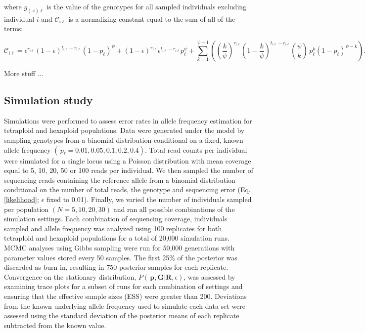 \documentclass[11pt,english,letterpaper,oneside]{article}
\begin{document}
\noindent where $g_{(\text{-}i) \ell}$ is the value of the genotypes for all sampled individuals excluding individual $i$ and $\mathcal{C}_{i \ell}$ is a normalizing constant equal to the sum of all of the terms:

\begin{equation*}
\mathcal{C}_{i \ell} = \epsilon^{r_{i \ell}}(1-\epsilon)^{t_{i \ell}-r_{i \ell}}(1-p_{\ell})^\psi + (1-\epsilon)^{r_{i \ell}}\epsilon^{t_{i \ell}-r_{i \ell}}p_{\ell}^\psi + \sum_{k=1}^{\psi-1}\left(\left(\frac{k}{\psi}\right)^{r_{i \ell}}\left(1-\frac{k}{\psi}\right)^{t_{i \ell}-r_{i \ell}}\binom{\psi}{k}\,p_{\ell}^k(1-p_{\ell})^{\psi-k}\right).
\end{equation*}

More stuff $\ldots$

\medskip
\subsection*{Simulation study}
\medskip

Simulations were performed to assess error rates in allele frequency estimation for tetraploid and hexaploid populations. Data were generated under the model by sampling genotypes from a binomial distribution conditional on a fixed, known allele frequency $(\,p_{\ell} = 0.01, 0.05, 0.1, 0.2, 0.4)$. Total read counts per individual were simulated for a single locus using a Poisson distribution with mean coverage equal to 5, 10, 20, 50 or 100 reads per individual. We then sampled the number of sequencing reads containing the reference allele from a binomial distribution conditional on the number of total reads, the genotype and sequencing error (Eq. \ref{likelihood}; $\epsilon$ fixed to 0.01). Finally, we varied the number of individuals sampled per population $(N = 5, 10, 20, 30)$ and ran all possible combinations of the simulation settings. Each combination of sequencing coverage, individuals sampled and allele frequency was analyzed using 100 replicates for both tetraploid and hexaploid populations for a total of  20,000 simulation runs. MCMC analyses using Gibbs sampling were run for 50,000 generations with parameter values stored every 50 samples. The first 25\% of the posterior was discarded as burn-in, resulting in 750 posterior samples for each replicate. Convergence on the stationary distribution, $P(\,\bm{p},\bm{G}|\bm{R},\epsilon)$, was assessed by examining trace plots for a subset of runs for each combination of settings and ensuring that the effective sample sizes (ESS) were greater than 200. Deviations from the known underlying allele frequency used to simulate each data set were assessed using the standard deviation of the posterior means of each replicate subtracted from the known value.
\medskip
\end{document}
